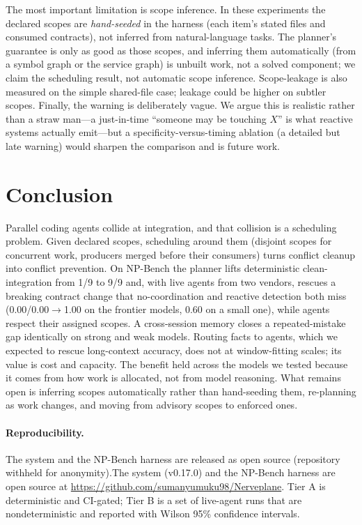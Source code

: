 The most important limitation is scope inference. In these experiments the declared scopes are
\emph{hand-seeded} in the harness (each item's stated files and consumed contracts), not inferred
from natural-language tasks. The planner's guarantee is only as good as those scopes, and inferring
them automatically (from a symbol graph or the service graph) is unbuilt work, not a solved
component; we claim the scheduling result, not automatic scope inference. Scope-leakage is also
measured on the simple shared-file case; leakage could be higher on subtler scopes. Finally, the
 warning is deliberately vague. We argue this is realistic rather than a straw man---a
just-in-time ``someone may be touching $X$'' is what reactive systems actually emit---but a
specificity-versus-timing ablation (a detailed but late warning) would sharpen the comparison and is
future work.

\section{Conclusion}
\label{sec:conclusion}

Parallel coding agents collide at integration, and that collision is a scheduling problem. Given declared
scopes, scheduling around them (disjoint scopes for concurrent work, producers merged
before their consumers) turns conflict cleanup into conflict prevention. On NP-Bench the planner lifts
deterministic clean-integration from 1/9 to 9/9 and, with live agents from two vendors, rescues a
breaking contract change that no-coordination and reactive detection both miss (0.00/0.00$\rightarrow$1.00
on the frontier models, 0.60 on a small one), while agents respect their assigned scopes. A
cross-session memory closes a repeated-mistake gap identically on strong and weak models. Routing
facts to agents, which we expected to rescue long-context accuracy, does not at window-fitting
scales; its value is cost and capacity. The benefit held across the models we tested because it comes
from how work is allocated, not from model reasoning. What remains open is inferring scopes
automatically rather than hand-seeding them, re-planning as work changes, and moving from advisory
scopes to enforced ones.

\paragraph{Reproducibility.} \ifanon The system and the NP-Bench harness are released as open source
(repository withheld for anonymity).\else The system (\sysname v0.17.0) and the NP-Bench harness are
open source at \mbox{\url{https://github.com/sumanyumuku98/Nerveplane}}.\fi{} Tier A is deterministic and CI-gated; Tier B is a set of live-agent runs that are
nondeterministic and reported with Wilson 95\% confidence intervals.



